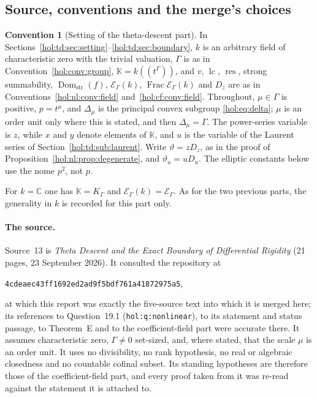 \documentclass[11pt]{article}
\numberwithin{equation}{section}
\theoremstyle{definition}
\newtheorem{convention}[theorem]{Convention}
\theoremstyle{remark}
\newcommand{\C}{\mathbb C}
\newcommand{\K}{K_\Gamma}
\newcommand{\E}{\mathcal E_\Gamma}
\newcommand{\lc}{\operatorname{lc}}
\newcommand{\res}{\operatorname{res}}
\newcommand{\Dom}{\operatorname{Dom}_{\mathrm{str}}}
\newcommand{\KK}{\mathbb K}
\newcommand{\EK}{\mathcal E_\Gamma(k)}
\newcommand{\FE}{\operatorname{Frac}\EK}
\begin{document}
\subsection{Source, conventions and the merge's choices}
\label{hol:td:sub:conventions}

\begin{convention}[Setting of the theta-descent part]\label{hol:td:conv:field}
In Sections~\ref{hol:td:sec:setting}--\ref{hol:td:sec:boundary}, $k$ is an
arbitrary field of characteristic zero with the trivial valuation, $\Gamma$ is
as in Convention~\ref{hol:conv:group}, $\KK=k((t^\Gamma))$, and $v$, $\lc$,
$\res$, strong summability, $\Dom(f)$, $\EK$, $\FE$ and $D_z$ are as in
Conventions~\ref{hol:nl:conv:field} and~\ref{hol:cf:conv:field}. Throughout,
$\mu\in\Gamma$ is positive, $p=t^\mu$, and $\Delta_\mu$ is the principal convex
subgroup \eqref{hol:eq:delta}; $\mu$ is an order unit only where this is
stated, and then $\Delta_\mu=\Gamma$. The power-series variable is $z$, while
$x$ and $y$ denote elements of $\KK$, and $u$ is the variable of the Laurent
series of Section~\ref{hol:td:sub:laurent}. Write $\vartheta=zD_z$, as in the
proof of Proposition~\ref{hol:nl:prop:degenerate}, and $\vartheta_u=uD_u$. The
elliptic constants below use the nome $p^2$, not $p$.
\end{convention}

For $k=\C$ one has $\KK=\K$ and $\EK=\E$. As for the two previous parts, the
generality in $k$ is recorded for this part only.

\paragraph{The source.}
Source~13 is \emph{Theta Descent and the Exact Boundary of Differential
Rigidity} (21 pages, 23 September 2026). It consulted the repository at
\begin{center}\small\texttt{4cdeaec43ff1692ed2ad9f5bdf761a41872975a5},\end{center}
at which this report was exactly the five-source text into which it is merged
here; its references to Question~19.1 (\texttt{hol:q:nonlinear}), to its
statement and status passage, to Theorem~E and to the coefficient-field part
were accurate there. It assumes characteristic zero, $\Gamma\ne0$ set-sized,
and, where stated, that the scale $\mu$ is an order unit. It uses no
divisibility, no rank hypothesis, no real or algebraic closedness and no
countable cofinal subset. Its standing hypotheses are therefore those of the
coefficient-field part, and every proof taken from it was re-read against the
statement it is attached to.
\end{document}
